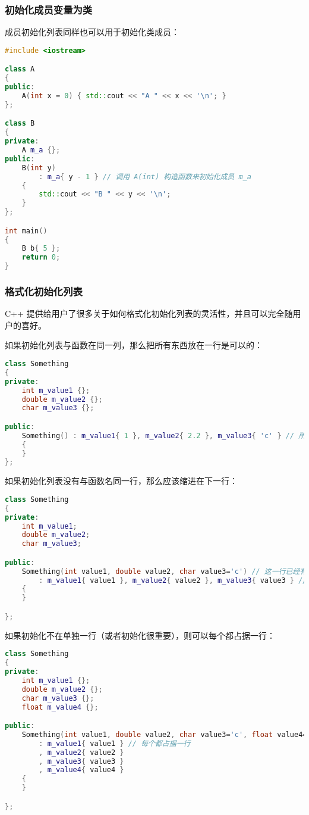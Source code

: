 \documentclass[../../LearnCpp.tex]{subfiles}
\begin{document}
\subsubsection*{初始化成员变量为类}

成员初始化列表同样也可以用于初始化类成员：

\begin{lstlisting}[language=C++]
#include <iostream>

class A
{
public:
    A(int x = 0) { std::cout << "A " << x << '\n'; }
};

class B
{
private:
    A m_a {};
public:
    B(int y)
        : m_a{ y - 1 } // 调用 A(int) 构造函数来初始化成员 m_a
    {
        std::cout << "B " << y << '\n';
    }
};

int main()
{
    B b{ 5 };
    return 0;
}
\end{lstlisting}

\subsubsection*{格式化初始化列表}

C++ 提供给用户了很多关于如何格式化初始化列表的灵活性，并且可以完全随用户的喜好。

如果初始化列表与函数在同一列，那么把所有东西放在一行是可以的：

\begin{lstlisting}[language=C++]
class Something
{
private:
    int m_value1 {};
    double m_value2 {};
    char m_value3 {};

public:
    Something() : m_value1{ 1 }, m_value2{ 2.2 }, m_value3{ 'c' } // 所有东西在一行
    {
    }
};
\end{lstlisting}

如果初始化列表没有与函数名同一行，那么应该缩进在下一行：

\begin{lstlisting}[language=C++]
class Something
{
private:
    int m_value1;
    double m_value2;
    char m_value3;

public:
    Something(int value1, double value2, char value3='c') // 这一行已经有很多东西了
        : m_value1{ value1 }, m_value2{ value2 }, m_value3{ value3 } // 所以可以把所有东西缩进再下一行
    {
    }

};
\end{lstlisting}

如果初始化不在单独一行（或者初始化很重要），则可以每个都占据一行：

\begin{lstlisting}[language=C++]
class Something
{
private:
    int m_value1 {};
    double m_value2 {};
    char m_value3 {};
    float m_value4 {};

public:
    Something(int value1, double value2, char value3='c', float value4=34.6f) // 这一行已经有很多东西了
        : m_value1{ value1 } // 每个都占据一行
        , m_value2{ value2 }
        , m_value3{ value3 }
        , m_value4{ value4 }
    {
    }

};
\end{lstlisting}
\end{document}
